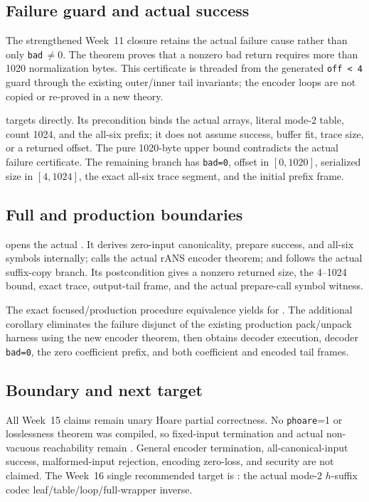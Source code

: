 \subsection*{Failure guard and actual success}

The strengthened Week~11 closure retains the actual failure cause rather than
only \texttt{bad}\,$\ne0$.  The theorem
 proves that a nonzero bad
return requires more than 1020 normalization bytes.  This certificate is
threaded from the generated \texttt{off < 4} guard through the existing
outer/inner tail invariants; the encoder loops are not copied or re-proved in
a new theory.

 targets
 directly.  Its precondition binds
the actual arrays, literal mode-2 table, count 1024, and the all-six prefix; it
does not assume success, buffer fit, trace size, or a returned offset.  The
pure 1020-byte upper bound contradicts the actual failure certificate.  The
remaining branch has \texttt{bad=0}, offset in $[0,1020]$, serialized size in
$[4,1024]$, the exact all-six trace segment, and the initial prefix frame.

\subsection*{Full and production boundaries}

 opens the actual
.  It derives zero-input
canonicality, prepare success, and all-six symbols internally; calls the
actual rANS encoder theorem; and follows the actual suffix-copy branch.  Its
postcondition gives a nonzero returned size, the 4--1024 bound, exact trace,
output-tail frame, and the actual prepare-call symbol witness.

The exact focused/production procedure equivalence yields
 for
.  The additional
corollary  eliminates
the failure disjunct of the existing production pack/unpack harness using the
new encoder theorem, then obtains decoder execution, decoder \texttt{bad=0},
the zero coefficient prefix, and both coefficient and encoded tail frames.

\subsection*{Boundary and next target}

All Week~15 claims remain unary Hoare partial correctness.  No
\texttt{phoare}=1 or losslessness theorem was compiled, so fixed-input
termination and actual non-vacuous reachability remain .
General encoder termination, all-canonical-input success, malformed-input
rejection, encoding zero-loss, and security are not claimed.  The Week~16
single recommended target is : the actual
mode-2 \(h\)-suffix codec leaf/table/loop/full-wrapper inverse.
